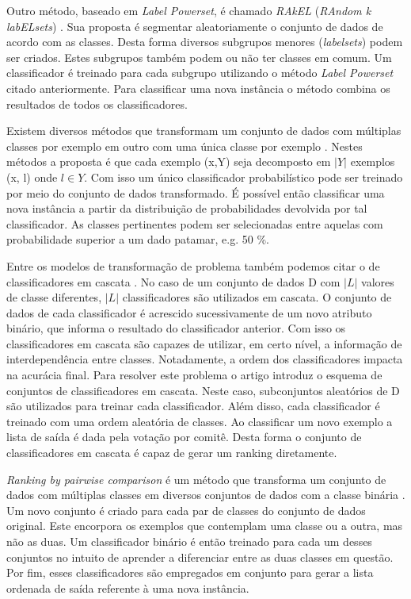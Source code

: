 Outro método, baseado em \textit{Label Powerset}, é chamado \textit{RAkEL} (\textit{RAndom k labELsets}) \cite{Tsoumakas03}.
Sua proposta é segmentar aleatoriamente o conjunto de dados de acordo com as classes.
Desta forma diversos subgrupos menores (\textit{labelsets}) podem ser criados.
Estes subgrupos também podem ou não ter classes em comum.
Um classificador é treinado para cada subgrupo utilizando o método \textit{Label Powerset} citado anteriormente.
Para classificar uma nova instância o método combina os resultados de todos os classificadores.

Existem diversos métodos que transformam um conjunto de dados com múltiplas classes por exemplo em outro com uma única classe por exemplo \cite{Boutell, Chen}.
Nestes métodos a proposta é que cada exemplo (x,Y) seja decomposto em $\vert Y \vert$ exemplos (x, l) onde $l \in Y$.
Com isso um único classificador probabilístico pode ser treinado por meio do conjunto de dados transformado.
É possível então classificar uma nova instância a partir da distribuição de probabilidades devolvida por tal classificador.
As classes pertinentes podem ser selecionadas entre aquelas com probabilidade superior a um dado patamar, e.g. 50 \%.

Entre os modelos de transformação de problema também podemos citar o de classificadores em cascata \cite{Read}. 
No caso de um conjunto de dados D com $\vert L \vert$ valores de classe diferentes, $\vert L \vert$ classificadores são utilizados em cascata. 
O conjunto de dados de cada classificador é acrescido sucessivamente de um novo atributo binário, que informa o resultado do classificador anterior. 
Com isso os classificadores em cascata são capazes de utilizar, em certo nível, a informação de interdependência entre classes. 
Notadamente, a ordem dos classificadores impacta na acurácia final.
Para resolver este problema o artigo introduz o esquema de conjuntos de classificadores em cascata. 
Neste caso, subconjuntos aleatórios de D são utilizados para treinar cada classificador. 
Além disso, cada classificador é treinado com uma ordem aleatória de classes. 
Ao classificar um novo exemplo a lista de saída é dada pela votação por comitê. 
Desta forma o conjunto de classificadores em cascata é capaz de gerar um ranking diretamente.

\textit{Ranking by pairwise comparison} é um método que transforma um conjunto de dados com múltiplas classes em diversos conjuntos de dados com a classe binária \cite{Hullermeier, Mencia, Furnkranz}.
Um novo conjunto é criado para cada par de classes do conjunto de dados original.
Este encorpora os exemplos que contemplam uma classe ou a outra, mas não as duas.
Um classificador binário é então treinado para cada um desses conjuntos no intuito de aprender a diferenciar entre as duas classes em questão.
Por fim, esses classificadores são empregados em conjunto para gerar a lista ordenada de saída referente à uma nova instância.


